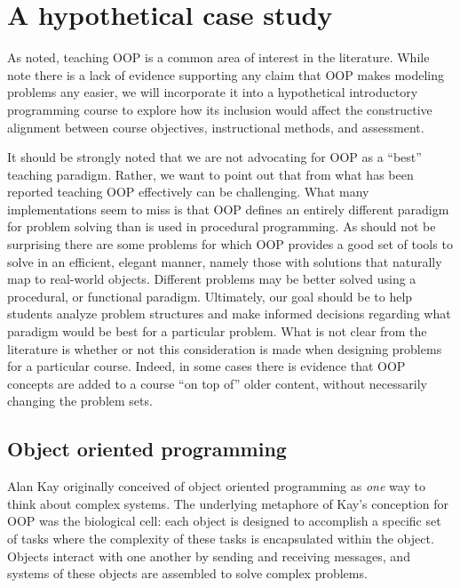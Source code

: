 \documentclass[12pt]{article}
\begin{document}
\section{A hypothetical case study}
As noted, teaching OOP is a common area of interest in the
literature. While \citeauthor{robins_learning_2003} note there is a
lack of evidence supporting any claim that OOP makes modeling problems
any easier\autocite{robins_learning_2003}, we will incorporate it into
a hypothetical introductory programming course to explore how its
inclusion would affect the constructive alignment between course
objectives, instructional methods, and assessment.

It should be strongly noted that we are not advocating for OOP as a
``best'' teaching paradigm. Rather, we want to point out that from
what has been reported teaching OOP effectively can be
challenging. What many implementations seem to miss is that OOP
defines an entirely different paradigm for problem solving than is
used in procedural programming\autocite{kolling_problem_1999}. As
should not be surprising there are some problems for which OOP
provides a good set of tools to solve in an efficient, elegant manner,
namely those with solutions that naturally map to real-world
objects\autocite{raymond_art_2003}. Different problems may be better
solved using a procedural, or functional
paradigm\autocite{kay_history_1996,felleisen_functional_2009,crestani_experience_2010}. Ultimately,
our goal should be to help students analyze problem structures and
make informed decisions regarding what paradigm would be best for a
particular problem. What is not clear from the literature is whether
or not this consideration is made when designing problems for a
particular course. Indeed, in some cases there is evidence that OOP
concepts are added to a course ``on top of'' older content, without
necessarily changing the problem
sets\autocite{kolling_problem_1999,vilner_fundamental_2007}.

\subsection{Object oriented programming}
Alan Kay originally conceived of object oriented programming as
\emph{one} way to think about complex
systems\autocite{kay_history_1996}. The underlying metaphore of Kay's
conception for OOP was the biological cell: each object is
designed to accomplish a specific set of tasks where the complexity of
these tasks is encapsulated within the object. Objects interact with
one another by sending and receiving messages, and systems of these
objects are assembled to solve complex
problems\autocite{kay_history_1996}.
\end{document}
